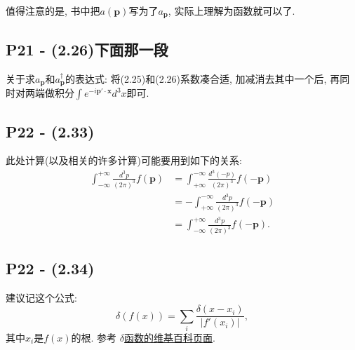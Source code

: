 值得注意的是, 书中把$a(\mathbf{p})$写为了$a_\mathbf{p}$, 实际上理解为函数就可以了.


\subsection{P21 - (2.26)下面那一段}

关于求$a_\mathbf{p}$和$a^{\dagger}_\mathbf{p}$的表达式: 将(2.25)和(2.26)系数凑合适, 加减消去其中一个后, 再同时对两端做积分$\int e^{-i\mathbf{p'\cdot x}} d^3 x$即可.


\subsection{P22 - (2.33)}

此处计算(以及相关的许多计算)可能要用到如下的关系:
\begin{equation}
  \begin{aligned}
    \int_{-\infty}^{+\infty}\frac{d^3 p}{(2\pi)^3}f(\mathbf p) & = \int_{+\infty}^{-\infty}\frac{d^3 (-p)}{(2\pi)^3}f(-\mathbf p) \\
                                                               & = -\int_{+\infty}^{-\infty}\frac{d^3 p}{(2\pi)^3}f(-\mathbf p)   \\
                                                               & = \int_{-\infty}^{+\infty}\frac{d^3 p}{(2\pi)^3}f(-\mathbf p).
  \end{aligned}
\end{equation}

\subsection{P22 - (2.34)}

建议记这个公式:
\begin{equation}\label{eq: delta_on_function}
  \delta(f(x)) = \sum_i \frac{\delta(x-x_i)}{|f'(x_i)|},
\end{equation}
其中$x_i$是$f(x)$的根. 参考 \href{https://zh.wikipedia.org/wiki/狄拉克δ函数#與函數的復合}{$\delta$函数的维基百科页面}.

